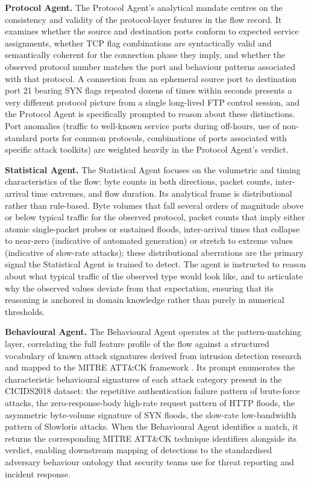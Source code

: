 \documentclass[../main.tex]{subfiles}
\begin{document}
\textbf{Protocol Agent.} The Protocol Agent's analytical mandate centres on the consistency and validity of the protocol-layer features in the flow record. It examines whether the source and destination ports conform to expected service assignments, whether TCP flag combinations are syntactically valid and semantically coherent for the connection phase they imply, and whether the observed protocol number matches the port and behaviour patterns associated with that protocol. A connection from an ephemeral source port to destination port 21 bearing SYN flags repeated dozens of times within seconds presents a very different protocol picture from a single long-lived FTP control session, and the Protocol Agent is specifically prompted to reason about these distinctions. Port anomalies (traffic to well-known service ports during off-hours, use of non-standard ports for common protocols, combinations of ports associated with specific attack toolkits) are weighted heavily in the Protocol Agent's verdict.

\textbf{Statistical Agent.} The Statistical Agent focuses on the volumetric and timing characteristics of the flow: byte counts in both directions, packet counts, inter-arrival time extremes, and flow duration. Its analytical frame is distributional rather than rule-based. Byte volumes that fall several orders of magnitude above or below typical traffic for the observed protocol, packet counts that imply either atomic single-packet probes or sustained floods, inter-arrival times that collapse to near-zero (indicative of automated generation) or stretch to extreme values (indicative of slow-rate attacks); these distributional aberrations are the primary signal the Statistical Agent is trained to detect. The agent is instructed to reason about what typical traffic of the observed type would look like, and to articulate why the observed values deviate from that expectation, ensuring that its reasoning is anchored in domain knowledge rather than purely in numerical thresholds.

\textbf{Behavioural Agent.} The Behavioural Agent operates at the pattern-matching layer, correlating the full feature profile of the flow against a structured vocabulary of known attack signatures derived from intrusion detection research and mapped to the MITRE ATT\&CK framework \autocite{MITRE2023}. Its prompt enumerates the characteristic behavioural signatures of each attack category present in the CICIDS2018 dataset: the repetitive authentication failure pattern of brute-force attacks, the zero-response-body high-rate request pattern of HTTP floods, the asymmetric byte-volume signature of SYN floods, the slow-rate low-bandwidth pattern of Slowloris attacks. When the Behavioural Agent identifies a match, it returns the corresponding MITRE ATT\&CK technique identifiers alongside its verdict, enabling downstream mapping of detections to the standardised adversary behaviour ontology that security teams use for threat reporting and incident response.
\end{document}
